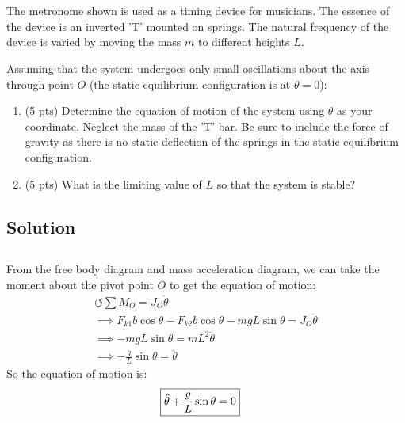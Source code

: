 \section{}


The metronome shown is used as a timing device for musicians. The essence of the device is an
inverted 'T' mounted on springs. The natural frequency of the device is varied by moving the mass
$m$ to different heights $L$.

Assuming that the system undergoes only small oscillations about the axis through point $O$ (the
static equilibrium configuration is at $\theta = 0$):
\begin{enumerate}[label=(\alph*)]
    \item (5 pts) Determine the equation of motion of the system using $\theta$ as your coordinate.
        Neglect the mass of the 'T' bar. Be sure to include the force of gravity as there is no
        static deflection of the springs in the static equilibrium configuration.
    \item (5 pts) What is the limiting value of $L$ so that the system is stable?
\end{enumerate}

\subsection*{Solution}
\subsection{}
From the free body diagram and mass acceleration diagram, we can take the moment about the 
pivot point $O$ to get the equation of motion:
\begin{gather*}
    \circlearrowleft \sum M_O = J_O \ddot{\theta} \\
    \implies F_{k1} b \cos \theta - F_{k2} b \cos \theta - mg L \sin \theta = J_O \ddot{\theta} \\
    \implies -mg L \sin\theta = mL^2 \ddot{\theta} \\
    \implies -\frac{g}{L} \sin\theta = \ddot{\theta}
\end{gather*}
So the equation of motion is:
\begin{align*}
    \Aboxed{\ddot{\theta} + \frac{g}{L} \sin\theta &= 0}
\end{align*}

